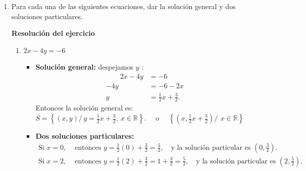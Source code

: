\documentclass[11pt]{article}
\begin{document}
\begin{enumerate}[\hspace{-5mm} 1) ]

\item  Para cada una de las siguientes ecuaciones, dar la solución general y dos soluciones particulares.

\begin{enumerate}
\end{enumerate}

\textbf{Resolución del ejercicio}

\begin{enumerate} 
    \item $2x - 4y = -6$
    \begin{itemize}
        \item \textbf{Solución general:} despejamos $y$ : \vspace{-7mm}
        \begin{align*}
          \qquad  2x - 4y &= -6 \\
            -4y &= -6 - 2x \\
            y &= \tfrac{1}{2}x + \tfrac{3}{2}.
        \end{align*}
        Entonces la solución general es: \quad $
           S = \left\{(x, y) /\, y = \tfrac{1}{2}x + \tfrac{3}{2}, \ x \in \mathbb{R}\right\}. 
           \quad \text{ o  } \quad 
           \left\{ \left(x, \tfrac{1}{2}x + \tfrac{3}{2} \right) /\,  \ x \in \mathbb{R}\right\} $

\medskip 
           
        \item \textbf{Dos soluciones particulares:}
        \begin{align*}
            \text{Si } x = 0, & \text{ entonces } y = \frac{1}{2}(0) + \frac{3}{2} = \frac{3}{2}, \quad \text{y  la solución particular es }  \left( 0, \tfrac{3}{2}\right). \\
            \text{Si } x = 2, &\text{ entonces }  y = \frac{1}{2}(2) + \frac{3}{2} = 1 + \frac{3}{2} = \frac{5}{2}, \quad \text{y  la solución particular es } \left( 2, \tfrac{5}{2}\right).
        \end{align*}
    \end{itemize}







\end{enumerate}
\end{enumerate}
\end{document}
